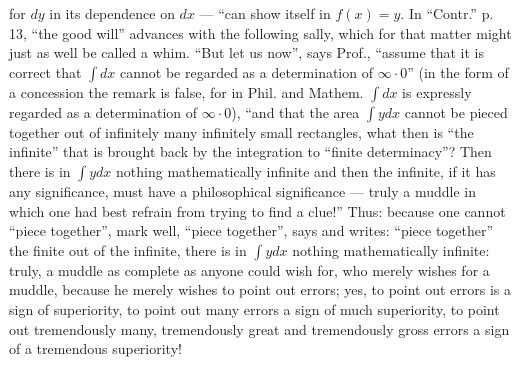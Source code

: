 \documentclass[12pt,a4paper,openany]{book}
\begin{document}
{for $dy$ in its dependence on $dx$ --- ``can show itself in $f(x) = y$.
In ``Contr.'' p. 13, ``the good will'' advances with the following
sally, which for that matter might just as well be called
a whim. ``But let us now'', says Prof., ``assume that
it is correct that $\int dx$ cannot be regarded as a determination of $\infty \cdot 0$'' (in the form of a concession the remark
is false, for in Phil. and Mathem. $\int dx$ is expressly regarded
as a determination of $\infty \cdot 0$), ``and that the area $\int y dx$ cannot be
pieced together out of infinitely many infinitely small rectangles, what
then is ``the infinite'' that is brought back by the integration to
``finite determinacy''? Then there is in $\int y dx$ nothing mathematically
infinite and then the infinite, if it has any significance, must have a philosophical significance --- truly a muddle
in which one had best refrain from trying to find a clue!'' Thus: because one
cannot ``piece together'', mark well, ``piece together'', says and
writes: ``piece together'' the finite out of the infinite, there is in
$\int y dx$ nothing mathematically infinite: truly, a muddle as
complete as anyone could wish for, who merely wishes for a muddle,
because he merely wishes to point out errors; yes, to point out errors is a
sign of superiority, to point out many errors a sign of
much superiority, to point out tremendously many, tremendously great and tremendously
gross errors a sign of a tremendous superiority!}
\end{document}

